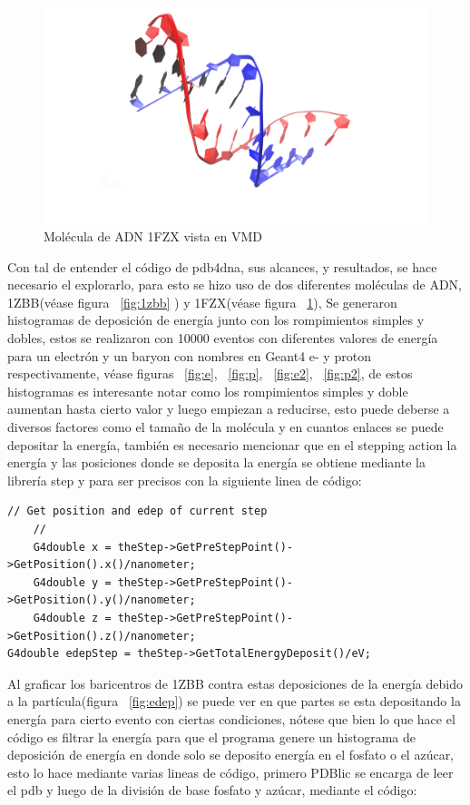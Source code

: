 \begin{figure}[htbp]
    \centering
    \includegraphics[width=0.8\linewidth]{./Figures/1FZX.png}
    \caption[Molécula de ADN 1FZX]{Molécula de ADN 1FZX vista en VMD}
    \label{fig:1fzx}
\end{figure}
Con tal de entender el código de pdb4dna, sus alcances, y resultados, se hace necesario el explorarlo, para esto se hizo uso de dos diferentes moléculas de ADN, 1ZBB(véase figura ~\ref{fig:1zbb} ) y 1FZX(véase figura ~\ref{fig:1fzx}), Se generaron histogramas de deposición de energía junto con los rompimientos simples y dobles, estos se realizaron con 10000 eventos con diferentes valores de energía para un electrón y un baryon con nombres en Geant4 e- y proton respectivamente, véase figuras ~\ref{fig:e}, ~\ref{fig:p}, ~\ref{fig:e2}, ~\ref{fig:p2}, de estos histogramas es interesante notar como los rompimientos simples y doble aumentan hasta cierto valor y luego empiezan a reducirse, esto puede deberse a diversos factores como el tamaño de la molécula y en cuantos enlaces se puede depositar la energía, también es necesario mencionar que en el stepping action la energía y las posiciones donde se deposita la energía se obtiene mediante la librería step y para ser precisos con la siguiente linea de código:
\lstset {language=C++}
\begin{lstlisting}
// Get position and edep of current step
    //
    G4double x = theStep->GetPreStepPoint()->GetPosition().x()/nanometer;
    G4double y = theStep->GetPreStepPoint()->GetPosition().y()/nanometer;
    G4double z = theStep->GetPreStepPoint()->GetPosition().z()/nanometer;
G4double edepStep = theStep->GetTotalEnergyDeposit()/eV;
\end{lstlisting}

Al graficar los baricentros de 1ZBB contra estas deposiciones de la energía debido a la partícula(figura ~\ref{fig:edep}) se puede ver en que partes se esta depositando la energía para cierto evento con ciertas condiciones, nótese que  bien lo que hace el código es filtrar la energía para que el programa genere un histograma de deposición de energía en donde solo se deposito energía en el fosfato o el azúcar, esto lo hace mediante varias lineas de código, primero PDBlic se encarga de leer el pdb y luego de la división de base fosfato y azúcar, mediante el código:

